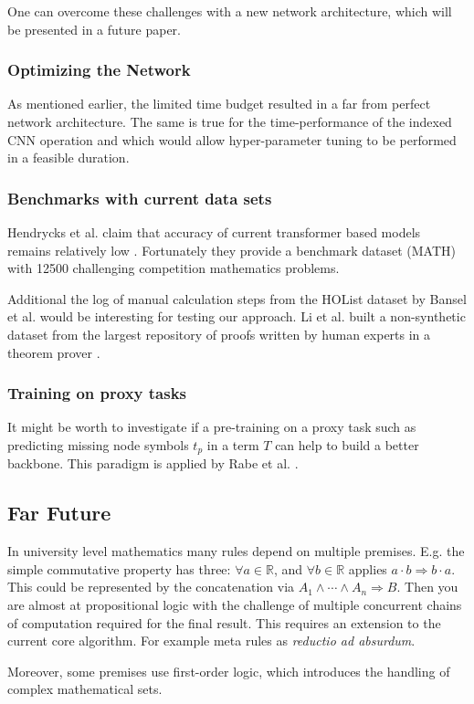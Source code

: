 \documentclass{scrartcl}
\theoremstyle{definition}
\begin{document}
One can overcome these challenges with a new network architecture, which will be presented in a future paper.

\subsubsection{Optimizing the Network}

As mentioned earlier, the limited time budget resulted in a far from perfect network architecture.
The same is true for the time-performance of the indexed CNN operation and which would allow hyper-parameter tuning to be performed in a feasible duration.

\subsubsection{Benchmarks with current data sets}

Hendrycks et al. claim that accuracy of current transformer based models remains relatively low \cite{hendrycks2021measuring}.
Fortunately they provide a benchmark dataset (MATH) with 12500 challenging competition mathematics problems.

Additional the log of manual calculation steps from the HOList dataset by Bansel et al. \cite{kaliszyk2017holstep} would be interesting for testing our approach.
Li et al. built a non-synthetic dataset from the largest repository of proofs written by human experts in a theorem prover \cite{li2021isarstep}.

\subsubsection{Training on proxy tasks}

It might be worth to investigate if a pre-training on a proxy task such as predicting missing node symbols $t_p$ in a term $T$ can help to build a better backbone.
This paradigm is applied by Rabe et al. \cite{rabe2020mathematical}.

\subsection{Far Future}

In university level mathematics many rules depend on multiple premises.
E.g. the simple commutative property has three: $\forall a \in \mathbb{R}$, and $\forall b \in \mathbb{R}$ applies $a\cdot b \Longrightarrow b\cdot a$.
This could be represented by the concatenation via $A_1 \wedge \cdots \wedge A_n \Longrightarrow B$.
Then you are almost at propositional logic with the challenge of multiple concurrent chains of computation required for the final result.
This requires an extension to the current core algorithm. For example meta rules as \textit{reductio ad absurdum}.

Moreover, some premises use first-order logic, which introduces the handling of complex mathematical sets.


\printbibliography
\end{document}
